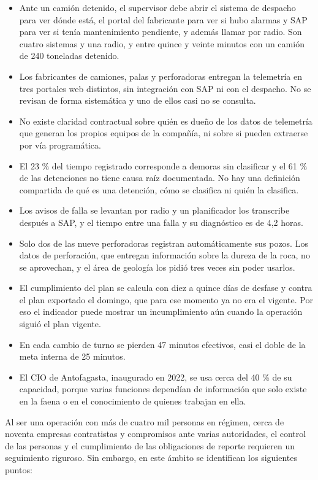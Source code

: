 \documentclass[anexo]{../../comun/overfore}
\begin{document}
\begin{itemize}
\item Ante un camión detenido, el supervisor debe abrir el sistema de despacho para ver dónde está, el portal del fabricante para ver si hubo alarmas y SAP para ver si tenía mantenimiento pendiente, y además llamar por radio. Son cuatro sistemas y una radio, y entre quince y veinte minutos con un camión de 240 toneladas detenido.
\item Los fabricantes de camiones, palas y perforadoras entregan la telemetría en tres portales web distintos, sin integración con SAP ni con el despacho. No se revisan de forma sistemática y uno de ellos casi no se consulta.
\item No existe claridad contractual sobre quién es dueño de los datos de telemetría que generan los propios equipos de la compañía, ni sobre si pueden extraerse por vía programática.
\item El 23 \% del tiempo registrado corresponde a demoras sin clasificar y el 61 \% de las detenciones no tiene causa raíz documentada. No hay una definición compartida de qué es una detención, cómo se clasifica ni quién la clasifica.
\item Los avisos de falla se levantan por radio y un planificador los transcribe después a SAP, y el tiempo entre una falla y su diagnóstico es de 4,2 horas.
\item Solo dos de las nueve perforadoras registran automáticamente sus pozos. Los datos de perforación, que entregan información sobre la dureza de la roca, no se aprovechan, y el área de geología los pidió tres veces sin poder usarlos.
\item El cumplimiento del plan se calcula con diez a quince días de desfase y contra el plan exportado el domingo, que para ese momento ya no era el vigente. Por eso el indicador puede mostrar un incumplimiento aún cuando la operación siguió el plan vigente.
\item En cada cambio de turno se pierden 47 minutos efectivos, casi el doble de la meta interna de 25 minutos.
\item El CIO de Antofagasta, inaugurado en 2022, se usa cerca del 40 \% de su capacidad, porque varias funciones dependían de información que solo existe en la faena o en el conocimiento de quienes trabajan en ella.
\end{itemize}

Al ser una operación con más de cuatro mil personas en régimen, cerca de noventa empresas contratistas y compromisos ante varias autoridades, el control de las personas y el cumplimiento de las obligaciones de reporte requieren un seguimiento riguroso. Sin embargo, en este ámbito se identifican los siguientes puntos:
\end{document}
